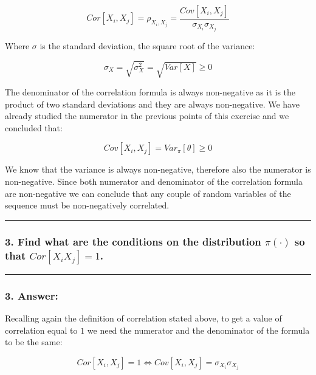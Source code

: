 \documentclass[
]{article}
\begin{document}
\[
Cor[X_i, X_j] = \rho_{X_i,X_j} = \frac{Cov[X_i, X_j]}{\sigma_{X_i}\sigma_{X_j}}
\]

Where \(\sigma\) is the standard deviation, the square root of the
variance:

\[
\sigma_X = \sqrt{\sigma^2_X}=\sqrt{Var[X]}\ge0
\]

The denominator of the correlation formula is always non-negative as it
is the product of two standard deviations and they are always
non-negative. We have already studied the numerator in the previous
points of this exercise and we concluded that:

\[
Cov[X_i, X_j] = Var_\pi[\theta] \ge 0
\]

We know that the variance is always non-negative, therefore also the
numerator is non-negative. Since both numerator and denominator of the
correlation formula are non-negative we can conclude that any couple of
random variables of the sequence must be non-negatively correlated.

\begin{center}\rule{0.5\linewidth}{0.5pt}\end{center}

\hypertarget{find-what-are-the-conditions-on-the-distribution-picdot-so-that-corx_i-x_j1.}{%
\subsubsection{\texorpdfstring{3. Find what are the conditions on the
distribution \(\pi(\cdot)\) so that
\(Cor[X_i X_j]=1\).}{3. Find what are the conditions on the distribution \textbackslash pi(\textbackslash cdot) so that Cor{[}X\_i X\_j{]}=1.}}\label{find-what-are-the-conditions-on-the-distribution-picdot-so-that-corx_i-x_j1.}}

\begin{center}\rule{0.5\linewidth}{0.5pt}\end{center}

\hypertarget{answer-12}{%
\subsubsection{3. Answer:}\label{answer-12}}

Recalling again the definition of correlation stated above, to get a
value of correlation equal to \(1\) we need the numerator and the
denominator of the formula to be the same:

\[
Cor[X_i, X_j] = 1 \iff  Cov[X_i, X_j] = \sigma_{X_i}\sigma_{X_j}
\]
\end{document}
